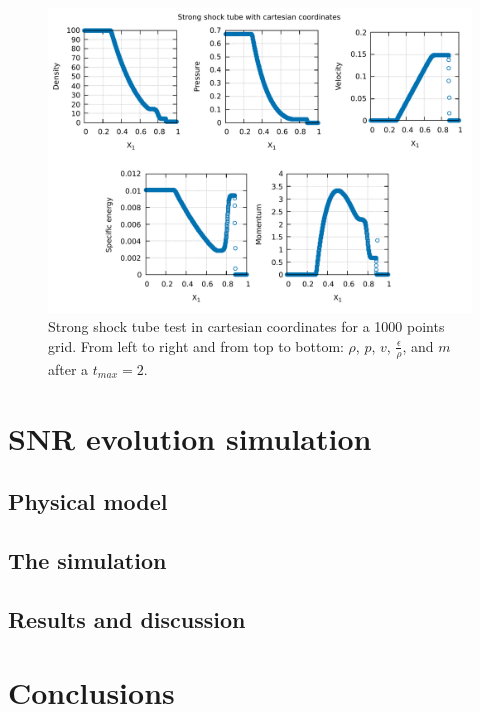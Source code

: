 \documentclass{article}
\begin{document}
\begin{figure}[H]
	\centering
	\includegraphics[width=0.9 \linewidth]{strongshocktube.pdf}
	\caption{Strong shock tube test in cartesian coordinates for a 1000 points grid. From left to right and from top to bottom: $\rho$, $p$, $v$, $\frac{\epsilon}{\rho}$, and $m$ after a $t_{max}=2$.}

	\label{fig:strongshock}
\end{figure}
\section{SNR evolution simulation}

\subsection{Physical model}

\subsection{The simulation}

\subsection{Results and discussion}

\section*{Conclusions}
\end{document}
